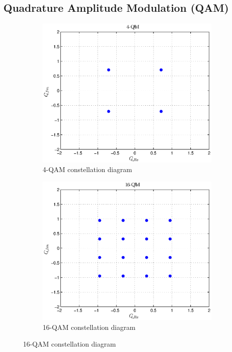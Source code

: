\subsection{Quadrature Amplitude Modulation (QAM)}
\begin{figure}[thb]
\centering

\begin{subfigure}[b]{0.42\textwidth}
    \includegraphics[width=\linewidth]{figs/4-QAM.eps}
    \caption{4-QAM constellation diagram}
    \label{fig:4QAM}
    \end{subfigure}%
\begin{subfigure}[b]{0.42\textwidth}
    \includegraphics[width=\linewidth]{figs/16-QAM.eps}
    \caption{16-QAM constellation diagram}
    \label{fig:16QAM}
    \end{subfigure}


\end{figure}
